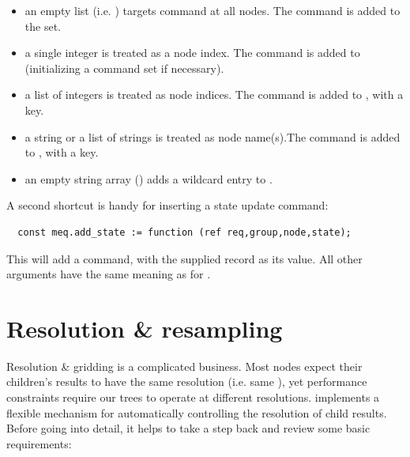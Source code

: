   \begin{itemize}  
  
  \item an empty list (i.e. \qq{[]}) targets command at all nodes. The command
  is added to the  set.
  
  \item a single integer is treated as a node index. The command is added
  to  (initializing a command set if necessary).
  
  \item a list of integers is treated as node indices. The command is added to
  , with a  key.
  
  \item a string or a list of strings is treated as node name(s).The command is
  added to , with a  key. 
  
  \item an empty string array () adds a wildcard entry to
  .

  \end{itemize}
  
  A second shortcut is handy for inserting a state update command:

  \begin{verbatim}
  const meq.add_state := function (ref req,group,node,state);
  \end{verbatim}
  
  This will add a  command, with the supplied  record as its
  value. All other arguments have the same meaning as for .

\section{Resolution \& resampling}
\label{sec:resampling}

  Resolution \& gridding is a complicated business. Most nodes expect their
  children's results to have the same resolution (i.e. same ), yet
  performance constraints require our trees to operate at different
  resolutions.  implements a flexible mechanism for automatically
  controlling the resolution of child results. Before going into detail, it
  helps to take a step back and review some basic requirements:


